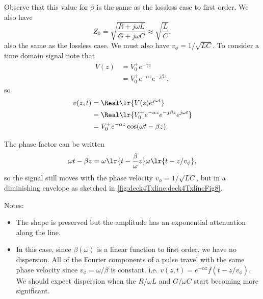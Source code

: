 Observe that this value for \( \beta \) is the same as the lossless case to first order.  We also have
\begin{equation}\label{eqn:uwaves4TransmissionLines:680}
Z_0
= \sqrt{ \frac{R + j \omega L}{G + j \omega C} }
\approx
\sqrt{ \frac{L}{C} },
\end{equation}
also the same as the lossless case.  We must also have \( v_\phi = 1/\sqrt{L C} \).  To consider a time domain signal note that
\begin{equation}\label{eqn:uwaves4TransmissionLines:700}
\begin{aligned}
V(z)
&= V_0^{+} e^{-\gamma z}
\\ &= V_0^{+} e^{-\alpha z} e^{-j \beta z},
\end{aligned}
\end{equation}
so
\begin{equation}\label{eqn:uwaves4TransmissionLines:720}
\begin{aligned}
v(z, t)
&= \Real \lr{ V(z) e^{j \omega t} }
\\ &= \Real \lr{ V_0^{+} e^{-\alpha z} e^{-j \beta z} e^{j \omega t} }
\\ &= V_0^{+} e^{-\alpha z} \cos( \omega t - \beta z ).
\end{aligned}
\end{equation}

The phase factor can be written
\begin{equation}\label{eqn:uwaves4TransmissionLines:740}
\omega t - \beta z
=
\omega \lr{ t - \frac{\beta}{\omega} z }
\omega \lr{ t - z/v_\phi },
\end{equation}
so the signal still moves with the phase velocity \( v_\phi = 1/\sqrt{LC} \), but in a diminishing envelope as sketched in \cref{fig:deck4Txline:deck4TxlineFig8}.

Notes:
\begin{itemize}
\item The shape is preserved but the amplitude has an exponential attenuation along the line.
\item In this case, since \( \beta(\omega) \) is a linear function to first order, we have no dispersion.  All of the Fourier components of a pulse travel with the same phase velocity since \( v_\phi = \omega/\beta \) is constant.  i.e.  \( v(z, t) = e^{-\alpha z} f( t - z/v_\phi ) \).  We should expect dispersion when the \( R/\omega L \) and \( G/\omega C \) start becoming more significant.
\end{itemize}
